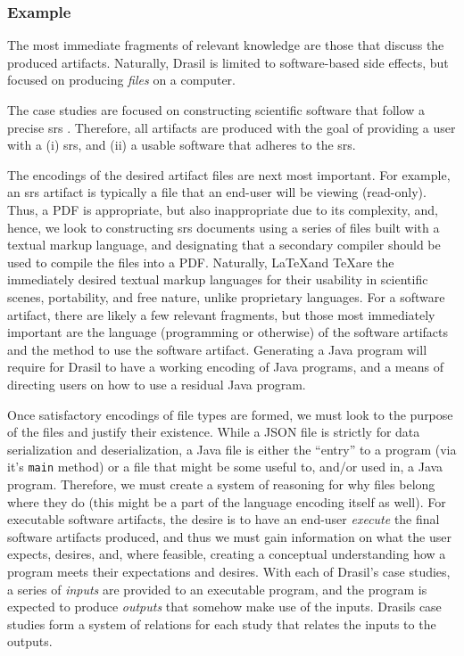 \subsubsection{Example}

The most immediate fragments of relevant knowledge are those that discuss the
produced artifacts. Naturally, Drasil is limited to software-based side effects,
but focused on producing \textit{files} on a computer.

The case studies are focused on constructing scientific software that follow a
precise \acs{srs} \cite{SmithAndLai2005}. Therefore, all artifacts are produced
with the goal of providing a user with a (i) \acl{srs}, and (ii) a usable
software that adheres to the \acl{srs}.

The encodings of the desired artifact files are next most important. For
example, an \acs{srs} artifact is typically a file that an end-user will be
viewing (read-only). Thus, a PDF is appropriate, but also inappropriate due to
its complexity, and, hence, we look to constructing \acs{srs} documents using a
series of files built with a textual markup language, and designating that a
secondary compiler should be used to compile the files into a PDF. Naturally,
\LaTeX and \TeX are the immediately desired textual markup languages for their
usability in scientific scenes, portability, and free nature, unlike proprietary
languages. For a software artifact, there are likely a few relevant fragments,
but those most immediately important are the language (programming or otherwise)
of the software artifacts and the method to use the software artifact.
Generating a Java program will require for Drasil to have a working encoding of
Java programs, and a means of directing users on how to use a residual Java
program.

Once satisfactory encodings of file types are formed, we must look to the
purpose of the files and justify their existence. While a JSON file is strictly
for data serialization and deserialization, a Java file is either the ``entry''
to a program (via it's \texttt{main} method) or a file that might be some useful
to, and/or used in, a Java program. Therefore, we must create a system of
reasoning for why files belong where they do (this might be a part of the
language encoding itself as well). For executable software artifacts, the desire
is to have an end-user \textit{execute} the final software artifacts produced,
and thus we must gain information on what the user expects, desires, and, where
feasible, creating a conceptual understanding how a program meets their
expectations and desires. With each of Drasil's case studies, a series of
\textit{inputs} are provided to an executable program, and the program is
expected to produce \textit{outputs} that somehow make use of the inputs.
Drasils case studies form a system of relations for each study that relates the
inputs to the outputs.

